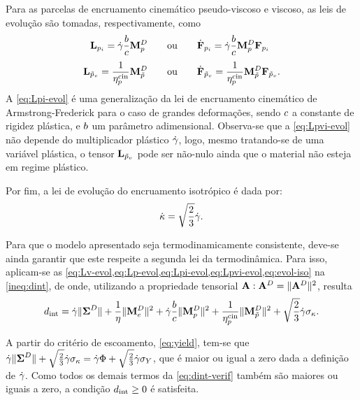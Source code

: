 \documentclass[Tese.tex]{subfiles}
\begin{document}
{Para as parcelas de encruamento cinemático pseudo-viscoso e viscoso, as leis de evolução são tomadas, respectivamente, como
\begin{align}
\mathbf{L}_{p_i} = \dot{\gamma}\dfrac{b}{c}\mathbf{M}_p^D \qquad&\text{ou}\qquad \dot{\mathbf{F}}_{p_i} = \dot{\gamma}\dfrac{b}{c}\mathbf{M}_p^D\mathbf{F}_{p_i} \label{eq:Lpi-evol}\\[0.1cm]
\mathbf{L}_{\tilde{p}_v} = \dfrac{1}{\eta_{p}^\text{cin}}\mathbf{M}_{\tilde{p}}^D \qquad&\text{ou}\qquad \dot{\mathbf{F}}_{\tilde{p}_v} = \dfrac{1}{\eta_{p}^\text{cin}}\mathbf{M}_{\tilde{p}}^D\mathbf{F}_{\tilde{p}_v}. \label{eq:Lpvi-evol}
\end{align}
A \cref{eq:Lpi-evol} é uma generalização da lei de encruamento cinemático de Armstrong-Frederick para o caso de grandes deformações, sendo $c$ a constante de rigidez plástica, e $b$ um parâmetro adimensional. Observa-se que a \cref{eq:Lpvi-evol} não depende do multiplicador plástico $\dot{\gamma}$, logo, mesmo tratando-se de uma variável plástica, o tensor $\mathbf{L}_{\tilde{p}_v}$ pode ser não-nulo ainda que o material não esteja em regime plástico. 

Por fim, a lei de evolução do encruamento isotrópico é dada por:
\begin{align}
	\dot{\kappa} = \sqrt{\dfrac{2}{3}}\dot{\gamma}. \label{eq:evol-iso}
\end{align}

Para que o modelo apresentado seja termodinamicamente consistente, deve-se ainda garantir que este respeite a segunda lei da termodinâmica. Para isso, aplicam-se as \cref{eq:Lv-evol,eq:Lp-evol,eq:Lpi-evol,eq:Lpvi-evol,eq:evol-iso} na \cref{ineq:dint}, de onde, utilizando a propriedade tensorial $\mathbf{A}:\mathbf{A}^D = \|\mathbf{A}^D\|^2$, resulta
\begin{equation}
d_\text{int} = \dot{\gamma}\|\boldsymbol{\Sigma}^D\| + \dfrac{1}{\eta}\|\mathbf{M}_e^D\|^2 + \dot{\gamma}\dfrac{b}{c}\|\mathbf{M}_p^D\|^2 + \dfrac{1}{\eta_{p}^\text{cin}}\|\mathbf{M}_{\tilde{p}}^D\|^2 + \sqrt{\dfrac{2}{3}}\dot{\gamma}\sigma_{\kappa}. \label{eq:dint-verif}
\end{equation}

A partir do critério de escoamento, \cref{eq:yield}, tem-se que $\dot{\gamma}\|\boldsymbol{\Sigma}^D\| + \sqrt{\frac{2}{3}}\dot{\gamma}\sigma_{\kappa} = \dot{\gamma}\Phi + \sqrt{\frac{2}{3}}\dot{\gamma}\sigma_Y$, que é maior ou igual a zero dada a definição de $\dot{\gamma}$. Como todos os demais termos da \cref{eq:dint-verif} também são maiores ou iguais a zero, a condição $d_\text{int} \geq 0$ é satisfeita. 

}
\end{document}
